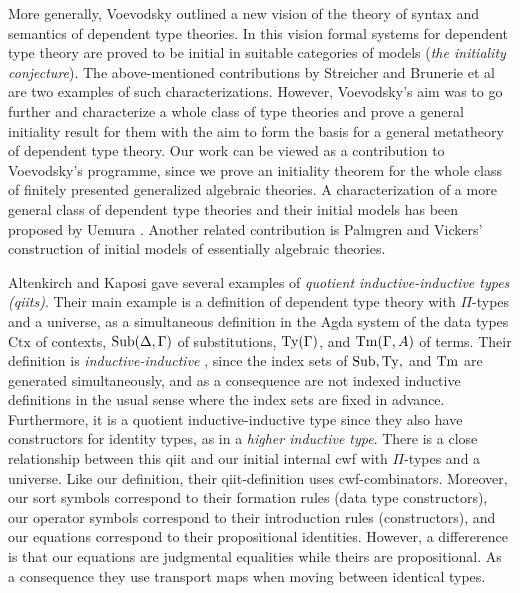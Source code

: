 \documentclass{lmcs}
\def\Ctx{\mathrm{Ctx}}
\begin{document}
More generally, Voevodsky \cite{voevodsky:initiality} outlined a new vision of the theory of syntax and semantics of dependent type theories. In this vision formal systems for dependent type theory are proved to be initial in suitable categories of models ({\em the initiality conjecture}). The above-mentioned contributions by Streicher and Brunerie et al are two examples of such characterizations. However, Voevodsky's aim was to go further and characterize a whole class of type theories and prove a general initiality result for them with the aim to form the basis for a general metatheory of dependent type theory. Our work can be viewed as a contribution to Voevodsky's programme, since we prove an initiality theorem for the whole class of finitely presented generalized algebraic theories. A characterization of a more general class of dependent type theories and their initial models has been proposed by Uemura \cite{uemura:general-framework}. Another related contribution is Palmgren and Vickers' \cite{palmgrenvickers} construction of initial models of essentially algebraic theories.

Altenkirch and Kaposi \cite{altenkirch:qiits} gave several examples of {\em quotient inductive-inductive types (qiits)}. Their main example is a definition of dependent type theory with $\Pi$-types and a universe, as a simultaneous definition in the Agda system \cite{agda-wiki} of the data types $\Ctx$ of contexts, $\mathrm{Sub}(\Delta,\Gamma)$ of substitutions, $\mathrm{Ty}(\Gamma)$, and $\mathrm{Tm}(\Gamma,A)$ of terms. Their definition is {\em inductive-inductive} \cite{nordvallforsberg:iids}, since the index sets of $\mathrm{Sub}, \mathrm{Ty},$ and $\mathrm{Tm}$ are generated simultaneously, and as a consequence are not indexed inductive definitions in the usual sense where the index sets are fixed in advance. Furthermore, it is a quotient inductive-inductive type since they also have constructors for identity types, as in a {\em higher inductive type}.
There is a close relationship between this qiit and our initial internal cwf with $\Pi$-types and a universe. Like our definition, their qiit-definition uses cwf-combinators. Moreover, our sort symbols correspond to their formation rules (data type constructors), our operator symbols correspond to their introduction rules (constructors), and our equations correspond to their propositional identities. However, a differerence is that our equations are judgmental equalities while theirs are propositional. As a consequence they use transport maps when moving between identical types.
\end{document}

